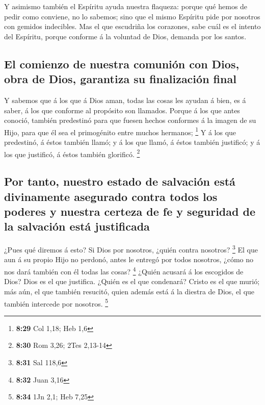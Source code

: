  Y asimismo también el Espíritu ayuda nuestra flaqueza:
porque qué hemos de pedir como conviene, no lo sabemos; sino que el
mismo Espíritu pide por nosotros con gemidos indecibles. 
Mas el que escudriña los corazones, sabe cuál es el intento del
Espíritu, porque conforme á la voluntad de Dios, demanda por los santos.

\hypertarget{el-comienzo-de-nuestra-comuniuxf3n-con-dios-obra-de-dios-garantiza-su-finalizaciuxf3n-final}{%
\subsection{El comienzo de nuestra comunión con Dios, obra de Dios,
garantiza su finalización
final}\label{el-comienzo-de-nuestra-comuniuxf3n-con-dios-obra-de-dios-garantiza-su-finalizaciuxf3n-final}}

 Y sabemos que á los que á Dios aman, todas las cosas les
ayudan á bien, es á saber, á los que conforme al propósito son llamados.
 Porque á los que antes conoció, también predestinó para
que fuesen hechos conformes á la imagen de su Hijo, para que él sea el
primogénito entre muchos hermanos; \footnote{\textbf{8:29} Col 1,18; Heb
  1,6}  Y á los que predestinó, á éstos también llamó; y
á los que llamó, á éstos también justificó; y á los que justificó, á
éstos también glorificó. \footnote{\textbf{8:30} Rom 3,26; 2Tes 2,13-14}

\hypertarget{por-tanto-nuestro-estado-de-salvaciuxf3n-estuxe1-divinamente-asegurado-contra-todos-los-poderes-y-nuestra-certeza-de-fe-y-seguridad-de-la-salvaciuxf3n-estuxe1-justificada}{%
\subsection{Por tanto, nuestro estado de salvación está divinamente
asegurado contra todos los poderes y nuestra certeza de fe y seguridad
de la salvación está
justificada}\label{por-tanto-nuestro-estado-de-salvaciuxf3n-estuxe1-divinamente-asegurado-contra-todos-los-poderes-y-nuestra-certeza-de-fe-y-seguridad-de-la-salvaciuxf3n-estuxe1-justificada}}

 ¿Pues qué diremos á esto? Si Dios por nosotros, ¿quién
contra nosotros? \footnote{\textbf{8:31} Sal 118,6}  El
que aun á su propio Hijo no perdonó, antes le entregó por todos
nosotros, ¿cómo no nos dará también con él todas las cosas? \footnote{\textbf{8:32}
  Juan 3,16}  ¿Quién acusará á los escogidos de Dios?
Dios es el que justifica.  ¿Quién es el que condenará?
Cristo es el que murió; más aún, el que también resucitó, quien además
está á la diestra de Dios, el que también intercede por nosotros.
\footnote{\textbf{8:34} 1Jn 2,1; Heb 7,25}

